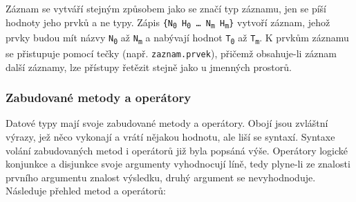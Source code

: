 \documentclass[a4paper,12pt]{article}
\begin{document}
Záznam se vytváří stejným způsobem jako se značí typ záznamu, jen se píší hodnoty jeho prvků a ne typy. Zápis \texttt{\{N\textsubscript{0} H\textsubscript{0} \ldots{} N\textsubscript{m} H\textsubscript{m}\}} vytvoří záznam, jehož prvky budou mít názvy \texttt{N\textsubscript{0}} až \texttt{N\textsubscript{m}} a nabývají hodnot \texttt{T\textsubscript{0}} až \texttt{T\textsubscript{m}}. K prvkům záznamu se přistupuje pomocí tečky (např. \texttt{zaznam.prvek}), přičemž obsahuje-li záznam další záznamy, lze přístupy řetězit stejně jako u jmenných prostorů.

\subsubsection{Zabudované metody a operátory}
Datové typy mají svoje zabudované metody a operátory. Obojí jsou zvláštní výrazy, jež něco vykonají a vrátí nějakou hodnotu, ale liší se syntaxí. Syntaxe volání zabudovaných metod i operátorů již byla popsáná výše. Operátory logické konjunkce a disjunkce svoje argumenty vyhodnocují líně, tedy plyne-li ze znalosti prvního argumentu znalost výsledku, druhý argument se nevyhodnoduje. Následuje přehled metod a operátorů:
\end{document}
